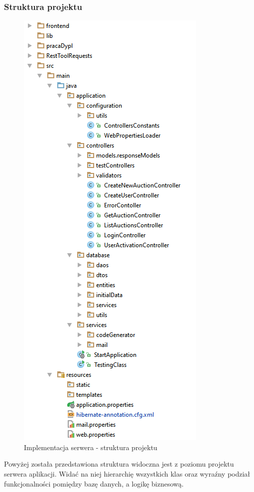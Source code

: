 \documentclass[10pt,titlepage]{article} %
\begin{document}
\subsubsection{Struktura projektu}
\begin{figure}[H]
\centerline{\includegraphics[height=0.85\textheight, keepaspectratio]{img/sekcja3/backend/strukturaProjektu}}
\caption[Implementacja serwera - struktura projektu]{Implementacja serwera - struktura projektu}
\end{figure} 
Powyżej została przedstawiona struktura widoczna jest z poziomu projektu serwera aplikacji. Widać na niej hierarchię wszystkich klas oraz wyraźny podział funkcjonalności pomiędzy bazę danych, a logikę biznesową.
\end{document}
